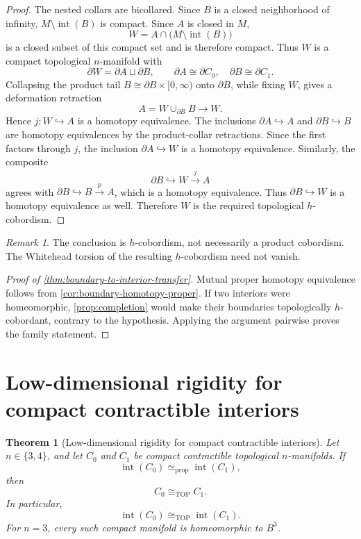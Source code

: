 \documentclass[10pt,reqno]{amsart}
\numberwithin{equation}{section}
\newtheorem{theorem}{Theorem}
\theoremstyle{definition}
\theoremstyle{remark}
\newtheorem{remark}{Remark}
\newcommand{\TOP}{\mathrm{TOP}}
\newcommand{\Int}{\operatorname{int}}
\newcommand{\simeqp}{\simeq_{\mathrm{prop}}}
\begin{document}
\begin{proof}
The nested collars are bicollared.  Since \(B\) is a closed
neighborhood of infinity, \(M\setminus\Int(B)\) is compact.  Since
\(A\) is closed in \(M\),
\[
W=A\cap\bigl(M\setminus\Int(B)\bigr)
\]
is a closed subset of this compact set and is therefore compact.
Thus \(W\) is a compact topological \(n\)-manifold with
\[
\partial W=\partial A\sqcup\partial B,\qquad
\partial A\cong\partial C_0,\quad
\partial B\cong\partial C_1.
\]
Collapsing the product tail
\(B\cong\partial B\times[0,\infty)\) onto \(\partial B\), while fixing
\(W\), gives a deformation retraction
\[
A=W\cup_{\partial B}B\longrightarrow W.
\]
Hence \(j\colon W\hookrightarrow A\) is a homotopy equivalence.  The
inclusions \(\partial A\hookrightarrow A\) and
\(\partial B\hookrightarrow B\) are homotopy equivalences by the
product-collar retractions.  Since the first factors through \(j\), the
inclusion \(\partial A\hookrightarrow W\) is a homotopy equivalence.
Similarly, the composite
\[
\partial B\hookrightarrow W\xrightarrow{\,j\,}A
\]
agrees with \(\partial B\hookrightarrow B\xrightarrow{\,p\,}A\), which
is a homotopy equivalence.  Thus
\(\partial B\hookrightarrow W\) is a homotopy equivalence as well.
Therefore \(W\) is the required topological \(h\)-cobordism.
\end{proof}

\begin{remark}
The conclusion is \(h\)-cobordism, not necessarily a product
cobordism.  The Whitehead torsion of the resulting \(h\)-cobordism
need not vanish.
\end{remark}

\begin{proof}[Proof of
\cref{thm:boundary-to-interior-transfer}]
Mutual proper homotopy equivalence follows from
\cref{cor:boundary-homotopy-proper}.  If two interiors were
homeomorphic, \cref{prop:completion} would make their boundaries
topologically \(h\)-cobordant, contrary to the hypothesis.  Applying
the argument pairwise proves the family statement.
\end{proof}


\section{Low-dimensional rigidity for compact contractible interiors}
\label{sec:low-dimensional-rigidity}

\begin{theorem}[Low-dimensional rigidity for compact contractible
interiors]\label{thm:low-dimensional-rigidity}
Let \(n\in\{3,4\}\), and let \(C_0\) and \(C_1\) be compact
contractible topological \(n\)-manifolds.  If
\[
\Int(C_0)\simeqp\Int(C_1),
\]
then
\[
C_0\cong_{\TOP}C_1.
\]
In particular,
\[
\Int(C_0)\cong_{\TOP}\Int(C_1).
\]
For \(n=3\), every such compact manifold is homeomorphic to \(B^3\).
\end{theorem}
\end{document}

